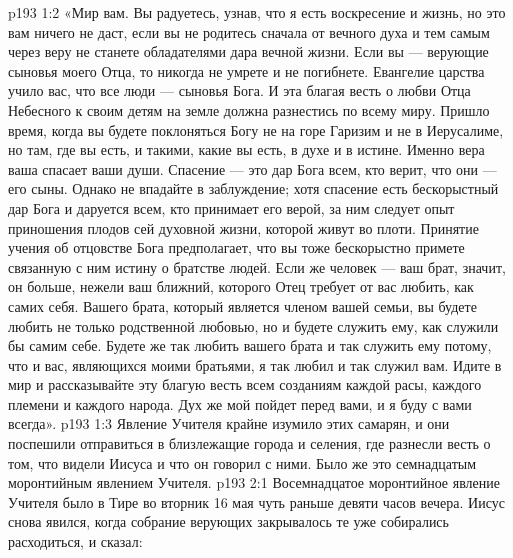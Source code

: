 \vs p193 1:2 \pc «Мир вам. Вы радуетесь, узнав, что я есть воскресение и жизнь, но это вам ничего не даст, если вы не родитесь сначала от вечного духа и тем самым через веру не станете обладателями дара вечной жизни. Если вы --- верующие сыновья моего Отца, то никогда не умрете и не погибнете. Евангелие царства учило вас, что все люди --- сыновья Бога. И эта благая весть о любви Отца Небесного к своим детям на земле должна разнестись по всему миру. Пришло время, когда вы будете поклоняться Богу не на горе Гаризим и не в Иерусалиме, но там, где вы есть, и такими, какие вы есть, в духе и в истине. Именно вера ваша спасает ваши души. Спасение --- это дар Бога всем, кто верит, что они --- его сыны. Однако не впадайте в заблуждение; хотя спасение есть бескорыстный дар Бога и даруется всем, кто принимает его верой, за ним следует опыт приношения плодов сей духовной жизни, которой живут во плоти. Принятие учения об отцовстве Бога предполагает, что вы тоже бескорыстно примете связанную с ним истину о братстве людей. Если же человек --- ваш брат, значит, он больше, нежели ваш ближний, которого Отец требует от вас любить, как самих себя. Вашего брата, который является членом вашей семьи, вы будете любить не только родственной любовью, но и будете служить ему, как служили бы самим себе. Будете же так любить вашего брата и так служить ему потому, что и вас, являющихся моими братьями, я так любил и так служил вам. Идите в мир и рассказывайте эту благую весть всем созданиям каждой расы, каждого племени и каждого народа. Дух же мой пойдет перед вами, и я буду с вами всегда».
\vs p193 1:3 \pc Явление Учителя крайне изумило этих самарян, и они поспешили отправиться в близлежащие города и селения, где разнесли весть о том, что видели Иисуса и что он говорил с ними. Было же это семнадцатым моронтийным явлением Учителя.
\vs p193 2:1 Восемнадцатое моронтийное явление Учителя было в Тире во вторник 16 мая чуть раньше девяти часов вечера. Иисус снова явился, когда собрание верующих закрывалось те уже собирались расходиться, и сказал:
